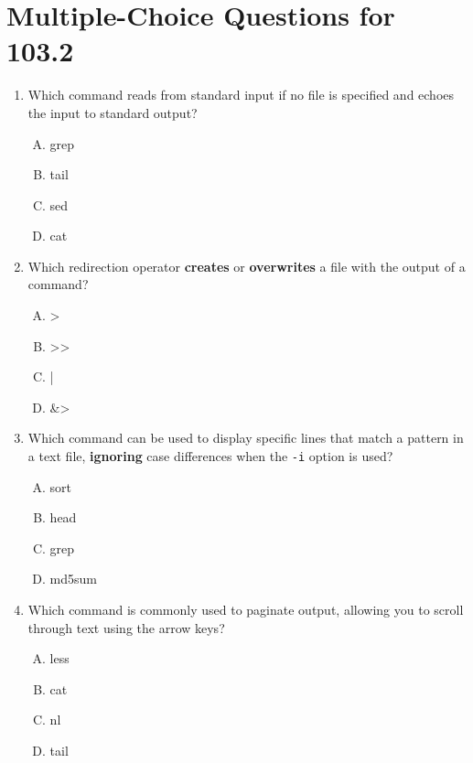 \documentclass[a4paper]{report}
\begin{document}
\section*{Multiple-Choice Questions for 103.2}
\begin{enumerate}[1.]

    \item Which command reads from standard input if no file is specified and echoes the input to standard output?  
    \begin{enumerate}[A)]
        \item grep  
        \item tail  
        \item sed  
        \item cat  
    \end{enumerate}

    \item Which redirection operator \textbf{creates} or \textbf{overwrites} a file with the output of a command?  
    \begin{enumerate}[A)]
        \item >  
        \item >>  
        \item |  
        \item \&>  
    \end{enumerate}

    \item Which command can be used to display specific lines that match a pattern in a text file, \textbf{ignoring} case differences when the \texttt{-i} option is used?  
    \begin{enumerate}[A)]
        \item sort  
        \item head  
        \item grep  
        \item md5sum  
    \end{enumerate}

    \item Which command is commonly used to paginate output, allowing you to scroll through text using the arrow keys?  
    \begin{enumerate}[A)]
        \item less  
        \item cat  
        \item nl  
        \item tail  
    \end{enumerate}


\end{enumerate}
\end{document}
